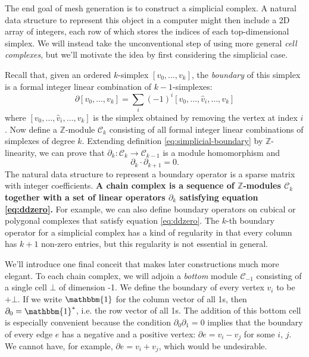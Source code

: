 \documentclass[twocolumn]{article}
\begin{document}
The end goal of mesh generation is to construct a simplicial complex.
A natural data structure to represent this object in a computer might then include a 2D array of integers, each row of which stores the indices of each top-dimensional simplex.
We will instead take the unconventional step of using more general \emph{cell complexes}, but we'll motivate the idea by first considering the simplicial case.

Recall that, given an ordered $k$-simplex $[v_0, \ldots, v_k]$, the \emph{boundary} of this simplex is a formal integer linear combination of $k - 1$-simplexes:
\begin{equation}
    \partial[v_0, \ldots, v_k] = \sum_i(-1)^i[v_0, \ldots, \hat v_i, \ldots, v_k]
    \label{eq:simplicial-boundary}
\end{equation}
where $[v_0, \ldots, \hat v_i, \ldots, v_k]$ is the simplex obtained by removing the vertex at index $i$.
Now define a $\mathbb{Z}$-module $\mathscr{C}_k$ consisting of all formal integer linear combinations of simplexes of degree $k$.
Extending definition \eqref{eq:simplicial-boundary} by $\mathbb{Z}$-linearity, we can prove that $\partial_k : \mathscr{C}_k \to \mathscr{C}_{k - 1}$ is a module homomorphism and
\begin{equation}
    \partial_k\cdot\partial_{k + 1} = 0.
    \label{eq:ddzero}
\end{equation}
The natural data structure to represent a boundary operator is a sparse matrix with integer coefficients.
\textbf{A chain complex is a sequence of $\mathbb{Z}$-modules $\mathscr{C}_k$ together with a set of linear operators $\partial_k$ satisfying equation \eqref{eq:ddzero}.}
For example, we can also define boundary operators on cubical or polygonal complexes that satisfy equation \eqref{eq:ddzero}.
The $k$-th boundary operator for a simplicial complex has a kind of regularity in that every column has $k + 1$ non-zero entries, but this regularity is not essential in general.

We'll introduce one final conceit that makes later constructions much more elegant.
To each chain complex, we will adjoin a \emph{bottom} module $\mathscr{C}_{-1}$ consisting of a single cell $\bot$ of dimension -1.
We define the boundary of every vertex $v_i$ to be $+\bot$.
If we write $\mathbbm{1}$ for the column vector of all 1s, then $\partial_0 = \mathbbm{1}^*$, i.e. the row vector of all 1s.
The addition of this bottom cell is especially convenient because the condition $\partial_0\partial_1 = 0$ implies that the boundary of every edge $e$ has a negative and a positive vertex: $\partial e = v_i - v_j$ for some $i$, $j$.
We cannot have, for example, $\partial e = v_i + v_j$, which would be undesirable.
\end{document}
